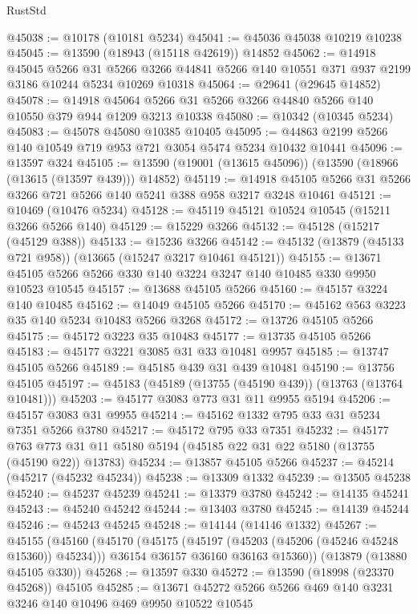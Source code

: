 \begin{lexlean}{RustStd}
\begin{coremodule}
@45038 := @10178 (@10181 @5234)
@45041 := @45036 @45038 @10219 @10238
@45045 := @13590 (@18943 (@15118 @42619)) @14852
@45062 := @14918
    @45045
    @5266
    @31
    @5266
    @3266
    @44841
    @5266
    @140
    @10551
    @371
    @937
    @2199
    @3186
    @10244
    @5234
    @10269
    @10318
@45064 := @29641 (@29645 @14852)
@45078 := @14918 @45064 @5266 @31 @5266 @3266 @44840 @5266 @140 @10550 @379 @944 @1209 @3213 @10338
@45080 := @10342 (@10345 @5234)
@45083 := @45078 @45080 @10385 @10405
@45095 := @44863 @2199 @5266 @140 @10549 @719 @953 @721 @3054 @5474 @5234 @10432 @10441
@45096 := @13597 @324
@45105 := @13590 (@19001 (@13615 @45096)) (@13590 (@18966 (@13615 (@13597 @439))) @14852)
@45119 := @14918 @45105 @5266 @31 @5266 @3266 @721 @5266 @140 @5241 @388 @958 @3217 @3248 @10461
@45121 := @10469 (@10476 @5234)
@45128 := @45119 @45121 @10524 @10545 (@15211 @3266 @5266 @140)
@45129 := @15229 @3266
@45132 := @45128 (@15217 (@45129 @388))
@45133 := @15236 @3266
@45142 := @45132 (@13879 (@45133 @721 @958)) (@13665 (@15247 @3217 @10461 @45121))
@45155 := @13671 @45105 @5266 @5266 @330 @140 @3224 @3247 @140 @10485 @330 @9950 @10523 @10545
@45157 := @13688 @45105 @5266
@45160 := @45157 @3224 @140 @10485
@45162 := @14049 @45105 @5266
@45170 := @45162 @563 @3223 @35 @140 @5234 @10483 @5266 @3268
@45172 := @13726 @45105 @5266
@45175 := @45172 @3223 @35 @10483
@45177 := @13735 @45105 @5266
@45183 := @45177 @3221 @3085 @31 @33 @10481 @9957
@45185 := @13747 @45105 @5266
@45189 := @45185 @439 @31 @439 @10481
@45190 := @13756 @45105
@45197 := @45183 (@45189 (@13755 (@45190 @439)) (@13763 (@13764 @10481)))
@45203 := @45177 @3083 @773 @31 @11 @9955 @5194
@45206 := @45157 @3083 @31 @9955
@45214 := @45162 @1332 @795 @33 @31 @5234 @7351 @5266 @3780
@45217 := @45172 @795 @33 @7351
@45232 := @45177
    @763
    @773
    @31
    @11
    @5180
    @5194
    (@45185 @22 @31 @22 @5180 (@13755 (@45190 @22)) @13783)
@45234 := @13857 @45105 @5266
@45237 := @45214 (@45217 (@45232 @45234))
@45238 := @13309 @1332
@45239 := @13505 @45238
@45240 := @45237 @45239
@45241 := @13379 @3780
@45242 := @14135 @45241
@45243 := @45240 @45242
@45244 := @13403 @3780
@45245 := @14139 @45244
@45246 := @45243 @45245
@45248 := @14144 (@14146 @1332)
@45267 := @45155
    (@45160
      (@45170
        (@45175 (@45197 (@45203 (@45206 (@45246 @45248 @15360)) @45234)))
        @36154
        @36157
        @36160
        @36163
        @15360))
    (@13879 (@13880 @45105 @330))
@45268 := @13597 @330
@45272 := @13590 (@18998 (@23370 @45268)) @45105
@45285 := @13671 @45272 @5266 @5266 @469 @140 @3231 @3246 @140 @10496 @469 @9950 @10522 @10545

\end{coremodule}
\end{lexlean}
